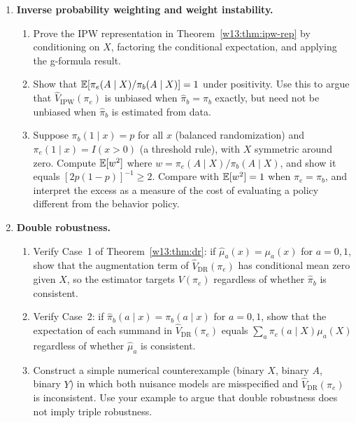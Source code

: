 \documentclass[master.tex]{subfiles}
\begin{document}
\begin{enumerate}
\item \textbf{Inverse probability weighting and weight instability.}
\begin{enumerate}
  \item Prove the IPW representation in Theorem~\ref{w13:thm:ipw-rep}
    by conditioning on $X$, factoring the conditional expectation, and
    applying the g-formula result.
  \item Show that $\mathbb{E}[\pi_e(A\mid X)/\pi_b(A\mid X)]=1$ under
    positivity.  Use this to argue that $\hat V_{\mathrm{IPW}}(\pi_e)$
    is unbiased when $\hat\pi_b=\pi_b$ exactly, but need not be
    unbiased when $\hat\pi_b$ is estimated from data.
  \item Suppose $\pi_b(1\mid x)=p$ for all $x$ (balanced
    randomization) and $\pi_e(1\mid x)=I(x>0)$ (a threshold rule),
    with $X$ symmetric around zero.  Compute $\mathbb{E}[w^2]$ where
    $w=\pi_e(A\mid X)/\pi_b(A\mid X)$, and show it equals
    $[2p(1-p)]^{-1}\geq 2$.  Compare with $\mathbb{E}[w^2]=1$ when
    $\pi_e=\pi_b$, and interpret the excess as a measure of the cost
    of evaluating a policy different from the behavior policy.
\end{enumerate}

\item \textbf{Double robustness.}
\begin{enumerate}
  \item Verify Case~1 of Theorem~\ref{w13:thm:dr}: if
    $\hat\mu_a(x)=\mu_a(x)$ for $a=0,1$, show that the augmentation
    term of $\hat V_{\mathrm{DR}}(\pi_e)$ has conditional mean zero
    given $X$, so the estimator targets $V(\pi_e)$ regardless of
    whether $\hat\pi_b$ is consistent.
  \item Verify Case~2: if $\hat\pi_b(a\mid x)=\pi_b(a\mid x)$ for
    $a=0,1$, show that the expectation of each summand in
    $\hat V_{\mathrm{DR}}(\pi_e)$ equals $\sum_a\pi_e(a\mid X)\mu_a(X)$
    regardless of whether $\hat\mu_a$ is consistent.
  \item Construct a simple numerical counterexample (binary $X$,
    binary $A$, binary $Y$) in which both nuisance models are
    misspecified and $\hat V_{\mathrm{DR}}(\pi_e)$ is inconsistent.
    Use your example to argue that double robustness does not imply
    triple robustness.
\end{enumerate}


\end{enumerate}
\end{document}
